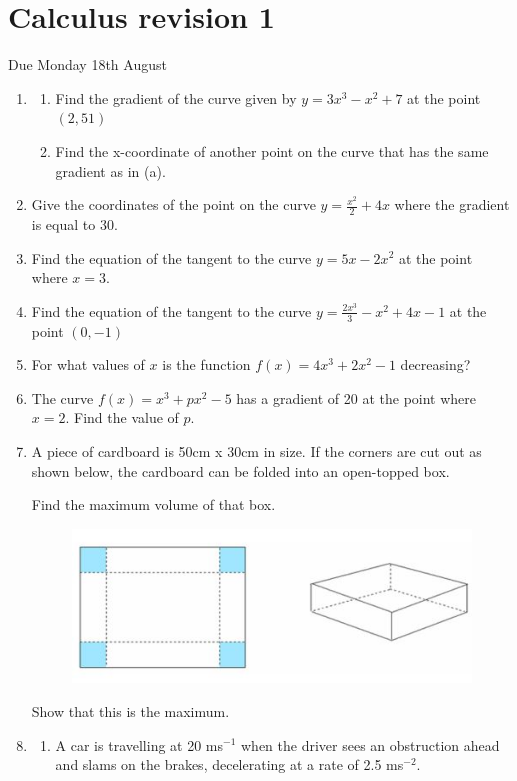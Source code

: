 \documentclass[12pt, letterpaper]{article}
\begin{document}
\setlength{\parskip}{10pt}

\section*{Calculus revision 1}
Due Monday 18th August

\begin{enumerate}[itemsep=6cm]
    \item 
    \begin{enumerate}[itemsep=6cm]
        \item Find the gradient of the curve given by $y=3x^3-x^2+7$ at the point $(2, 51)$
        \item Find the x-coordinate of another point on the curve that has the same gradient as in (a).
    \end{enumerate}
    

    \item 
    Give the coordinates of the point on the curve $y=\frac{x^2}{2}+4x$ where the gradient is equal to 30.
    \pagebreak
    \item 
    Find the equation of the tangent to the curve $y=5x-2x^2$ at the point where $x=3$.
    
    \item 
    Find the equation of the tangent to the curve $y=\frac{2x^3}{3}-x^2+4x-1$ at the point $(0,-1)$

    \item 
    For what values of $x$ is the function $f(x)=4x^3+2x^2-1$ decreasing?
    \pagebreak
    \item 
    The curve $f(x)=x^3+px^2-5$ has a gradient of 20 at the point where $x=2$. Find the value of $p$.

    \item 
    A piece of cardboard is 50cm x 30cm in size. If the corners are cut out as shown below, the cardboard can be folded into an open-topped box.

    Find the maximum volume of that box.

    \begin{figure}[h]
        \centering
        \includegraphics[width=0.5\linewidth]{images/net.png}
    \end{figure}
    Show that this is the maximum.
    \pagebreak
    \item 
    \begin{enumerate}[itemsep=6cm]
        \item 
        A car is travelling at 20 ms$^{-1}$ when the driver sees an obstruction ahead and slams on the brakes, decelerating at a rate of 2.5 ms$^{-2}$.


\end{enumerate}
\end{enumerate}
\end{document}
